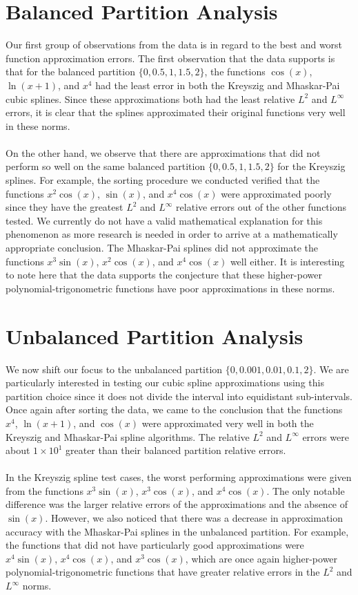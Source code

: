 \section{Balanced Partition Analysis}
Our first group of observations from the data is in regard to the best and worst function approximation errors. The first observation that the data supports is that for the balanced partition $\{0, 0.5, 1, 1.5, 2\}$, the functions $\cos(x)$, $\ln(x+1)$, and $x^4$ had the least error in both the Kreyszig and Mhaskar-Pai cubic splines. Since these approximations both had the least relative $L^2$ and $L^{\infty}$ errors, it is clear that the splines approximated their original functions very well in these norms. 
\\\\
On the other hand, we observe that there are approximations that did not perform so well on the same balanced partition $\{0, 0.5, 1, 1.5, 2\}$ for the Kreyszig splines. For example, the sorting procedure we conducted verified that the functions $x^2\cos(x)$, $\sin(x)$, and $x^4\cos(x)$ were approximated poorly since they have the greatest $L^2$ and $L^{\infty}$ relative errors out of the other functions tested. We currently do not have a valid mathematical explanation for this phenomenon as more research is needed in order to arrive at a mathematically appropriate conclusion. The Mhaskar-Pai splines did not approximate the functions $x^3\sin(x)$, $x^2\cos(x)$, and $x^4\cos(x)$ well either. It is interesting to note here that the data supports the conjecture that these higher-power polynomial-trigonometric functions have poor approximations in these norms.

\section{Unbalanced Partition Analysis}
We now shift our focus to the unbalanced partition $\{0, 0.001, 0.01, 0.1, 2\}$. We are particularly interested in testing our cubic spline approximations using this partition choice since it does not divide the interval into equidistant sub-intervals. Once again after sorting the data, we came to the conclusion that the functions $x^4$, $\ln(x+1)$, and $\cos(x)$ were approximated very well in both the Kreyszig and Mhaskar-Pai spline algorithms. The relative $L^2$ and $L^{\infty}$ errors were about $1 \times 10^{1}$ greater than their balanced partition relative errors.
\\\\
In the Kreyszig spline test cases, the worst performing approximations were given from the functions $x^3\sin(x)$, $x^3\cos(x)$, and $x^4\cos(x)$. The only notable difference was the larger relative errors of the approximations and the absence of $\sin(x)$. However, we also noticed that there was a decrease in approximation accuracy with the Mhaskar-Pai splines in the unbalanced partition. For example, the functions that did not have particularly good approximations were $x^4\sin(x)$, $x^4\cos(x)$, and $x^3\cos(x)$, which are once again higher-power polynomial-trigonometric functions that have greater relative errors in the $L^2$ and $L^{\infty}$ norms. 

